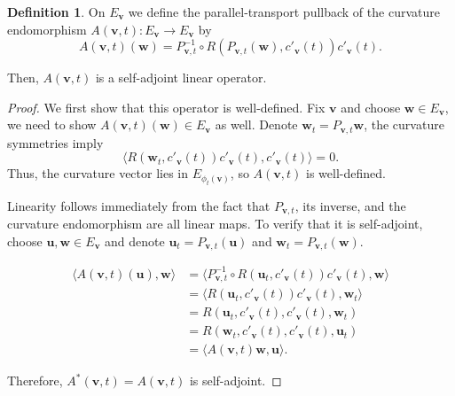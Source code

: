 \documentclass[reqno,11pt]{article}
\theoremstyle{definition}
\newtheorem{definition}{Definition}[section]
\theoremstyle{remark}
\numberwithin{equation}{section}
\begin{document}
\begin{definition}\label{def_6_1}
	On $E_{\bm{v}}$ we define the parallel-transport pullback of the curvature endomorphism $A(\bm{v},t):E_{\bm{v}}\to E_{\bm{v}}$ by
	\begin{equation}
		A(\bm{v},t)(\bm{w})=P^{-1}_{\bm{v},t}\circ R(P_{\bm{v},t}(\bm{w}),c'_{\bm{v}}(t))c'_{\bm{v}}(t).
	\end{equation}

	Then, $A(\bm{v},t)$ is a self-adjoint linear operator.
\end{definition}

\begin{proof}
	We first show that this operator is well-defined. Fix $\bm{v}$ and choose $\bm{w}\in E_{\bm{v}}$, we need to show $A(\bm{v},t)(\bm{w})\in E_{\bm{v}}$ as well. Denote $\bm{w}_t=P_{\bm{v},t}\bm{w}$, the curvature symmetries imply
	\begin{displaymath}
		\langle R(\bm{w}_t,c'_{\bm{v}}(t))c'_{\bm{v}}(t),c'_{\bm{v}}(t)\rangle=0.
	\end{displaymath}
	Thus, the curvature vector lies in $E_{\phi_{t}(\bm{v})}$, so $A(\bm{v},t)$ is well-defined.

	Linearity follows immediately from the fact that $P_{\bm{v},t}$, its inverse, and the curvature endomorphism are all linear maps. To verify that it is self-adjoint, choose $\bm{u},\bm{w}\in E_{\bm{v}}$ and denote $\bm{u}_t=P_{\bm{v},t}(\bm{u})$ and $\bm{w}_t=P_{\bm{v},t}(\bm{w})$.

	\begin{displaymath}
		\begin{aligned}
			\langle A(\bm{v},t)(\bm{u}),\bm{w}\rangle & =\langle P^{-1}_{\bm{v},t}\circ R(\bm{u}_t,c'_{\bm{v}}(t))c'_{\bm{v}}(t),\bm{w}\rangle \\
			                                          & =\langle R(\bm{u}_t,c'_{\bm{v}}(t))c'_{\bm{v}}(t),\bm{w}_{t}\rangle                    \\
			                                          & =R(\bm{u}_t, c'_{\bm{v}}(t),c'_{\bm{v}}(t),\bm{w}_t)                                   \\
			                                          & =R(\bm{w}_t,c'_{\bm{v}}(t),c'_{\bm{v}}(t),\bm{u}_t)                                    \\
			                                          & =\langle A(\bm{v},t)\bm{w},\bm{u}\rangle.
		\end{aligned}
	\end{displaymath}

	Therefore, $A^{\ast}(\bm{v},t)=A(\bm{v},t)$ is self-adjoint.
\end{proof}
\end{document}
